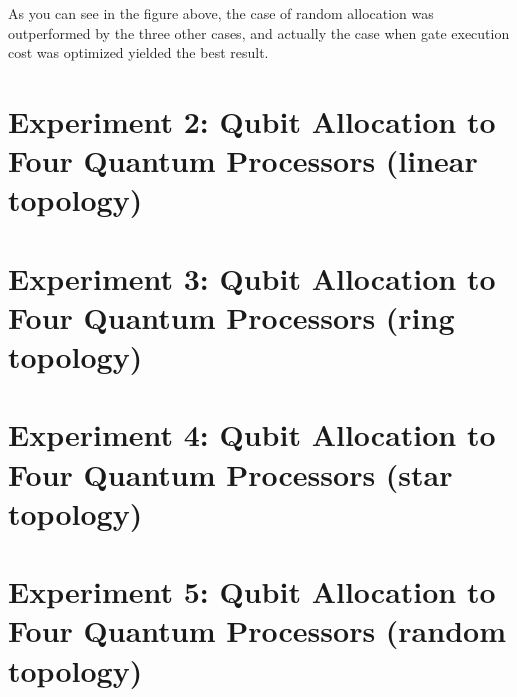  As you can see in the figure above, the case of random allocation was outperformed by the three other cases, and actually the case when gate execution cost was optimized yielded the best result.
 
\section{Experiment 2: Qubit Allocation to Four Quantum Processors (linear topology)}
\section{Experiment 3: Qubit Allocation to Four Quantum Processors (ring topology)}
\section{Experiment 4: Qubit Allocation to Four Quantum Processors (star topology)}
\section{Experiment 5: Qubit Allocation to Four Quantum Processors (random topology)}


